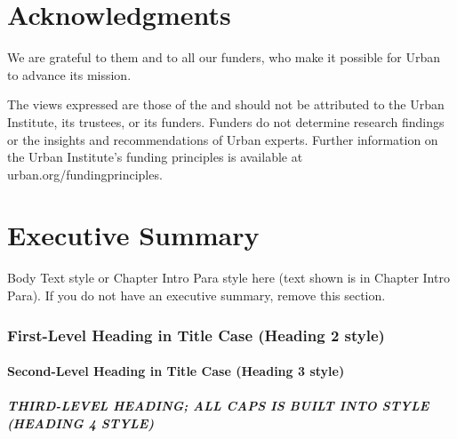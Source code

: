\documentclass{urban-formatting}
\begin{document}
\newpage
\tableofcontents

\newpage
\part*{Acknowledgments}

 We are grateful to them and to all our funders, who make it possible for Urban to advance its mission. 

The views expressed are those of the  and should not be attributed to the Urban Institute, its trustees, or its funders. Funders do not determine research findings or the insights and recommendations of Urban experts. Further information on the Urban Institute’s funding principles is available at urban.org/fundingprinciples.


\newpage
\part*{Executive Summary}

Body Text style or Chapter Intro Para style here (text shown is in Chapter Intro Para). If you do not have an executive summary, remove this section.

\section*{First-Level Heading in Title Case (Heading 2 style)}

\subsection*{Second-Level Heading in Title Case (Heading 3 style)}

\subsubsection*{THIRD-LEVEL HEADING; ALL CAPS IS BUILT INTO STYLE (HEADING 4 STYLE)}
\end{document}
